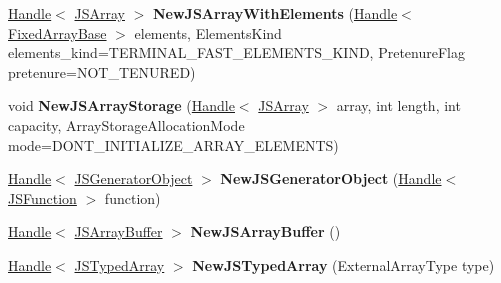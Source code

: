\begin{DoxyCompactItemize}
\item 
\hypertarget{classv8_1_1internal_1_1_v8___f_i_n_a_l_a2ac578a937a6fc187f2d8bf9f7363091}{}\hyperlink{classv8_1_1internal_1_1_handle}{Handle}$<$ \hyperlink{classv8_1_1internal_1_1_j_s_array}{J\+S\+Array} $>$ {\bfseries New\+J\+S\+Array\+With\+Elements} (\hyperlink{classv8_1_1internal_1_1_handle}{Handle}$<$ \hyperlink{classv8_1_1internal_1_1_fixed_array_base}{Fixed\+Array\+Base} $>$ elements, Elements\+Kind elements\+\_\+kind=T\+E\+R\+M\+I\+N\+A\+L\+\_\+\+F\+A\+S\+T\+\_\+\+E\+L\+E\+M\+E\+N\+T\+S\+\_\+\+K\+I\+N\+D, Pretenure\+Flag pretenure=N\+O\+T\+\_\+\+T\+E\+N\+U\+R\+E\+D)\label{classv8_1_1internal_1_1_v8___f_i_n_a_l_a2ac578a937a6fc187f2d8bf9f7363091}

\item 
\hypertarget{classv8_1_1internal_1_1_v8___f_i_n_a_l_a03b60522eb747f66feef3352b1fc812d}{}void {\bfseries New\+J\+S\+Array\+Storage} (\hyperlink{classv8_1_1internal_1_1_handle}{Handle}$<$ \hyperlink{classv8_1_1internal_1_1_j_s_array}{J\+S\+Array} $>$ array, int length, int capacity, Array\+Storage\+Allocation\+Mode mode=D\+O\+N\+T\+\_\+\+I\+N\+I\+T\+I\+A\+L\+I\+Z\+E\+\_\+\+A\+R\+R\+A\+Y\+\_\+\+E\+L\+E\+M\+E\+N\+T\+S)\label{classv8_1_1internal_1_1_v8___f_i_n_a_l_a03b60522eb747f66feef3352b1fc812d}

\item 
\hypertarget{classv8_1_1internal_1_1_v8___f_i_n_a_l_a8fbf4ab8cf2dbc975c489b8fea1a0398}{}\hyperlink{classv8_1_1internal_1_1_handle}{Handle}$<$ \hyperlink{classv8_1_1internal_1_1_j_s_generator_object}{J\+S\+Generator\+Object} $>$ {\bfseries New\+J\+S\+Generator\+Object} (\hyperlink{classv8_1_1internal_1_1_handle}{Handle}$<$ \hyperlink{classv8_1_1internal_1_1_j_s_function}{J\+S\+Function} $>$ function)\label{classv8_1_1internal_1_1_v8___f_i_n_a_l_a8fbf4ab8cf2dbc975c489b8fea1a0398}

\item 
\hypertarget{classv8_1_1internal_1_1_v8___f_i_n_a_l_a7b10dd0a5b5384b56b45727be18f73ef}{}\hyperlink{classv8_1_1internal_1_1_handle}{Handle}$<$ \hyperlink{classv8_1_1internal_1_1_j_s_array_buffer}{J\+S\+Array\+Buffer} $>$ {\bfseries New\+J\+S\+Array\+Buffer} ()\label{classv8_1_1internal_1_1_v8___f_i_n_a_l_a7b10dd0a5b5384b56b45727be18f73ef}

\item 
\hypertarget{classv8_1_1internal_1_1_v8___f_i_n_a_l_a9c15fd4b6063452bba7c206e86b89bf5}{}\hyperlink{classv8_1_1internal_1_1_handle}{Handle}$<$ \hyperlink{classv8_1_1internal_1_1_j_s_typed_array}{J\+S\+Typed\+Array} $>$ {\bfseries New\+J\+S\+Typed\+Array} (External\+Array\+Type type)\label{classv8_1_1internal_1_1_v8___f_i_n_a_l_a9c15fd4b6063452bba7c206e86b89bf5}


\end{DoxyCompactItemize}
